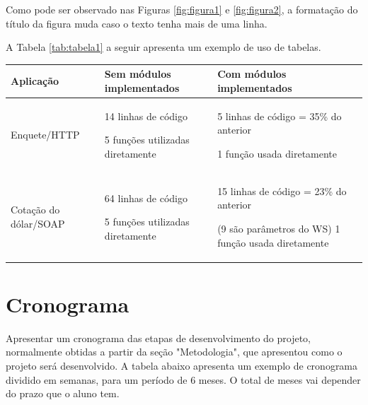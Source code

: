 \documentclass[12pt]{article}
\begin{document}
Como pode ser observado nas Figuras \ref{fig:figura1} e \ref{fig:figura2}, a formatação do título da figura muda caso o texto tenha mais de uma linha.

A Tabela \ref{tab:tabela1} a seguir apresenta um exemplo de uso de tabelas.

\begin{center}
	\begin{tabular}{|p{3cm}|p{4cm}|p{6cm}|} %
  \hline
		\textbf{Aplicação} & \textbf{Sem módulos implementados} & \textbf{Com módulos implementados} \\
  \hline
		Enquete/HTTP & 14 linhas de código\par5 funções  utilizadas diretamente & 
    5 linhas de código = 35\% do anterior\par1 função usada diretamente \\
  \hline
		Cotação do dólar/SOAP & 64 linhas de código\par5 funções  utilizadas diretamente & 
    15 linhas de código = 23\% do anterior
    \par(9 são parâmetros do WS) 1 função  usada diretamente \\
  \hline
	\end{tabular}
	\label{tab:tabela1}
\end{center}
	
	
\section{Cronograma} \label{sec:cronograma}

Apresentar um cronograma das etapas de desenvolvimento do projeto, normalmente obtidas a partir da seção "Metodologia", que apresentou como o projeto será desenvolvido. A tabela abaixo apresenta um exemplo de cronograma dividido em semanas, para um período de 6 meses. O total de meses vai depender do prazo que o aluno tem. 
\end{document}
